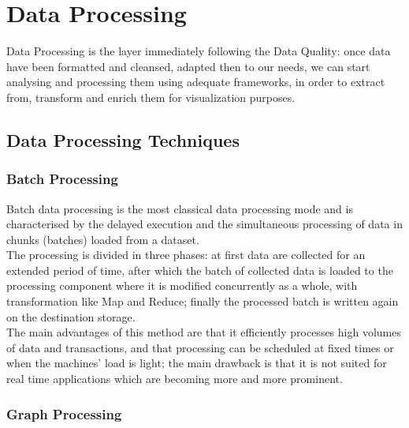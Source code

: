 \chapter{Data Processing}

Data Processing is the layer immediately following the Data Quality: once data have been formatted and cleansed, adapted then to our needs, we can start analysing and processing them using adequate frameworks, in order to extract from, transform and enrich them for visualization purposes.\\

\section{Data Processing Techniques}

\subsection{Batch Processing} \label{BatchProc}

Batch data processing is the most classical data processing mode and is characterised by the delayed execution and the simultaneous processing of data in chunks (batches) loaded from a dataset.
\\
\newline
The processing is divided in three phases: at first data are collected for an extended period of time, after which the batch of collected data is loaded to the processing component where it is modified concurrently as a whole, with transformation like Map and Reduce; finally the processed batch is written again on the destination storage.
\newline
\\
The main advantages of this method are that it efficiently processes high volumes of data and transactions, and that processing can be scheduled at fixed times or when the machines' load is light; the main drawback is that it is not suited for real time applications which are becoming more and more prominent.

\subsection{Graph Processing} \label{GraphProc}

